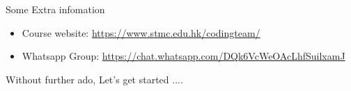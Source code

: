 \documentclass[10pt,xcolor={table,dvipsnames},t]{beamer}
\begin{document}
\begin{frame}{Some Extra infomation}
    \begin{itemize}
      \item Course website: \href{https://www.stmc.edu.hk/codingteam/}{https://www.stmc.edu.hk/codingteam/}
      \item Whatsapp Group: \href{https://chat.whatsapp.com/DQk6VcWeOAcLhfSuilxamJ}{https://chat.whatsapp.com/DQk6VcWeOAcLhfSuilxamJ}
    \end{itemize}
\end{frame}

\begin{frame}{Without further ado, Let's get started ....}
  
\end{frame}
\end{document}
